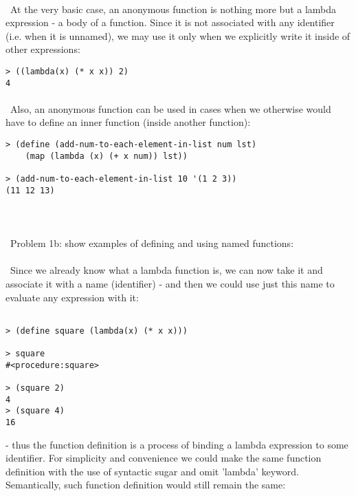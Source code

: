 \documentclass{article}
\begin{document}
\paragraph{}\
At the very basic case, an anonymous function is nothing more but a lambda expression - a body of a function. Since it is not associated with any identifier (i.e. when it is unnamed), we may use it only when we explicitly write it inside of other expressions:
\ttfamily
	
\begin{verbatim} 
> ((lambda(x) (* x x)) 2) 
4
\end{verbatim}

\rmfamily
\paragraph{}\
Also, an anonymous function can be used in cases when we otherwise would have to define an inner function (inside another function):

\begin{verbatim} 
> (define (add-num-to-each-element-in-list num lst)
    (map (lambda (x) (+ x num)) lst))
  
> (add-num-to-each-element-in-list 10 '(1 2 3))
(11 12 13)
\end{verbatim}

\paragraph{}\
\paragraph{}\
Problem 1b: show examples of defining and using named functions:
\paragraph{}\
Since we already know what a lambda function is, we can now take it and associate it with a name (identifier) - and then we could use just this name to evaluate any expression with it:

\begin{verbatim} 
 
> (define square (lambda(x) (* x x)))

> square
#<procedure:square>

> (square 2)
4
> (square 4)
16
\end{verbatim}
- thus the function definition is a process of binding a lambda expression to some identifier. For simplicity and convenience we could make the same function definition with the use of syntactic sugar and omit 'lambda' keyword. Semantically, such function definition would still remain the same:
\end{document}
